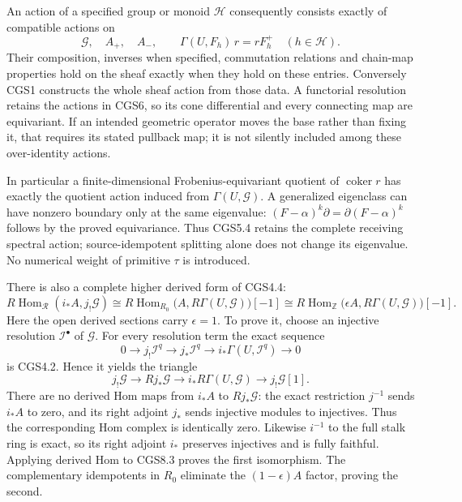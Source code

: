 An action of a specified group or monoid \(\mathcal H\) consequently
consists exactly of compatible actions on \[
 \mathcal G,\quad A_+,\quad A_-,
\qquad
 \Gamma(U,F_h)\,r=rF_h^+\quad(h\in\mathcal H).
\tag{CGS8.1}
\] Their composition, inverses when specified, commutation relations and
chain-map properties hold on the sheaf exactly when they hold on these
entries. Conversely CGS1 constructs the whole sheaf action from those
data. A functorial resolution retains the actions in CGS6, so its cone
differential and every connecting map are equivariant. If an intended
geometric operator moves the base rather than fixing it, that requires
its stated pullback map; it is not silently included among these
over-identity actions.

In particular a finite-dimensional Frobenius-equivariant quotient of
\(\operatorname{coker}r\) has exactly the quotient action induced from
\(\Gamma(U,\mathcal G)\). A generalized eigenclass can have nonzero
boundary only at the same eigenvalue:
\((F-\alpha)^k\partial=\partial(F-\alpha)^k\) follows by the proved
equivariance. Thus CGS5.4 retains the complete receiving spectral
action; source-idempotent splitting alone does not change its
eigenvalue. No numerical weight of primitive \(\tau\) is introduced.

There is also a complete higher derived form of CGS4.4: \[
 R\operatorname{Hom}_{\mathcal R}(i_*A,j_!\mathcal G)
 \cong
 R\operatorname{Hom}_{R_0}
       \bigl(A,R\Gamma(U,\mathcal G)\bigr)[-1]
 \cong
 R\operatorname{Hom}_{\mathbb Z}
       \bigl(\epsilon A,R\Gamma(U,\mathcal G)\bigr)[-1].
\tag{CGS8.2}
\] Here the open derived sections carry \(\epsilon=1\). To prove it,
choose an injective resolution \(\mathcal I^\bullet\) of \(\mathcal G\).
For every resolution term the exact sequence \[
 0\to j_!\mathcal I^q\to j_*\mathcal I^q
 \to i_*\Gamma(U,\mathcal I^q)\to0
\] is CGS4.2. Hence it yields the triangle \[
 j_!\mathcal G\to Rj_*\mathcal G
 \to i_*R\Gamma(U,\mathcal G)\to j_!\mathcal G[1].
\tag{CGS8.3}
\] There are no derived Hom maps from \(i_*A\) to \(Rj_*\mathcal G\):
the exact restriction \(j^{-1}\) sends \(i_*A\) to zero, and its right
adjoint \(j_*\) sends injective modules to injectives. Thus the
corresponding Hom complex is identically zero. Likewise \(i^{-1}\) to
the full stalk ring is exact, so its right adjoint \(i_*\) preserves
injectives and is fully faithful. Applying derived Hom to CGS8.3 proves
the first isomorphism. The complementary idempotents in \(R_0\)
eliminate the \((1-\epsilon)A\) factor, proving the second.

